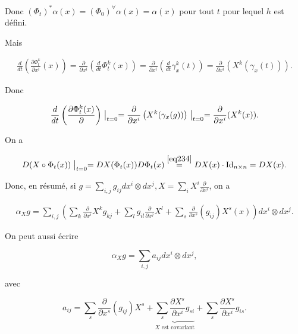 \documentclass[french]{article}
\theoremstyle{definition}
\begin{document}
Donc \((\Phi_t)^{*}\alpha(x) = (\Phi_0)^{\forall}\alpha(x) = \alpha(x)\) pour tout \(t\) pour lequel \(h\) est défini.




Mais

\begin{gather*}
  \frac{d}{dt}\left(\frac{\partial \Phi_t^{k} }{\partial x ^{i}}(x) \right) = \frac{\partial  }{\partial x ^{i}}\left(\frac{d}{dt}\Phi ^{k}_t(x)\right) = \frac{\partial  }{\partial x ^{i}} \left(\frac{d}{dt} \gamma_x ^{k}(t)\right)   = \frac{\partial  }{\partial x ^{i}} \left(X ^{k}(\gamma_x(t))\right).
\end{gather*}

Donc

\begin{equation}\label{eq234}
  \frac{d}{dt}\left(\frac{\partial \Phi ^{k}_t(x) }{\partial } \right)\bigm|_{t=0} = \frac{\partial  }{\partial x ^{i}}\left(X ^{k}(\gamma_x(g))\right)\bigm|_{t=0} = \frac{\partial  }{\partial x ^{i}}(X ^{k}(x)).
\end{equation}

On a

\[D(X \circ \Phi_t(x))\bigm|_{t=0} = DX(\Phi_t(x))D \Phi_t(x) \stackrel{\ref{eq234}}{=} DX(x) \cdot \operatorname{Id}_{n \times n} = D X(x).\]

Donc, en résumé, si \(g = \displaystyle \sum_{i,j} g _{ij} d x^{i}\otimes d x^{j}, X = \displaystyle \sum_{i} X ^{i} \frac{\partial  }{\partial x ^{i}}\), on a

\begin{gather}
  \alpha_{X}g = \sum_{i,j}\left(\sum_{k} \frac{\partial  }{\partial x ^{i}} X ^{k} g _{kj} + \sum_{l} g _{il} \frac{\partial  }{\partial x ^{j}}X ^{l} + \sum_{s}  \frac{\partial  }{\partial x ^{s}}(g _{ij})X ^{s}(x)  \right)d x^{i}\otimes d x^{j}.
\end{gather}

On peut aussi écrire

\[\alpha_X g = \sum_{i,j} a _{ij}d x^{i}\otimes d x^{j},\]

avec

\[a _{ij} = \sum_{s} \frac{\partial  }{\partial x ^{s}}(g _{ij})X ^{s} + \underbrace{ \sum_{s} \frac{\partial  X ^{s}}{\partial x ^{i}} g _{si}}_{X \text{ est covariant} }+ \sum_{s} \frac{\partial  X^{s} }{\partial x ^{i}} g _{is}.\]
\end{document}
